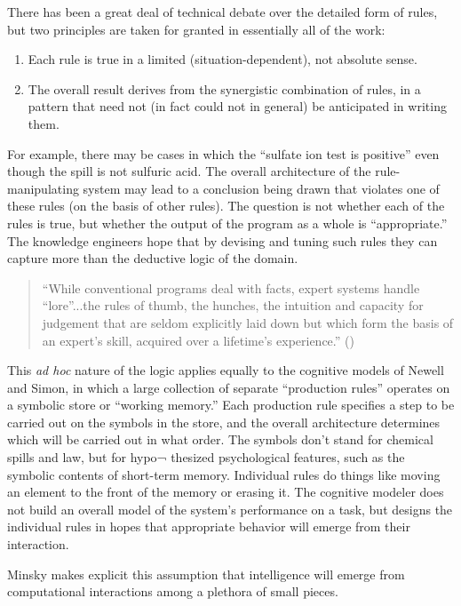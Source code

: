 \documentclass[12pt]{article}
\def\bq{\begin{quote}}
\def\eq{\end{quote}}
\begin{document}
There has been a great deal of technical debate over the detailed form of rules, but two principles are taken for granted in essentially all of the work:

\begin{enumerate}
\item Each rule is true in a limited (situation-dependent), not absolute sense. 

\item The overall result derives from the synergistic combination of rules, in a pattern that need not (in fact could not in general) be anticipated in writing them.

\end{enumerate}

For example, there may be cases in which the ``sulfate ion test is positive'' even though the spill is not sulfuric acid. The overall architecture of the rule-manipulating system may lead to a conclusion being drawn that violates one of these rules (on the basis of other rules). The question is not whether each of the rules is true, but whether the output of the program as a whole is ``appropriate.'' The knowledge engineers hope that by devising and tuning such rules they can capture more than the deductive logic of the domain.

\bq
``While conventional programs deal with facts, expert systems handle ``lore''...the rules of thumb, the hunches, the intuition and capacity
for judgement that are seldom explicitly laid down but which form the basis of an expert's skill, acquired over a lifetime's experience.'' ({\it \cite{michie1984}})
\eq

This {\it ad hoc} nature of the logic applies equally to the cognitive models of Newell and Simon, in which a large collection of separate ``production rules'' operates on a symbolic store or ``working memory.'' Each production rule specifies a step to be carried out on the symbols in the store, and the overall architecture determines which will be carried out in what order. The symbols don't stand for chemical spills and law, but for hypo¬ thesized psychological features, such as the symbolic contents of short-term memory. Individual rules do things like moving an element to the front of the memory or erasing it. The cognitive modeler does not build an overall model of the system's performance on a task, but designs the individual rules in hopes that appropriate behavior will emerge from their interaction.

Minsky makes explicit this assumption that intelligence will emerge from computational interactions among a plethora of small pieces.
\end{document}
